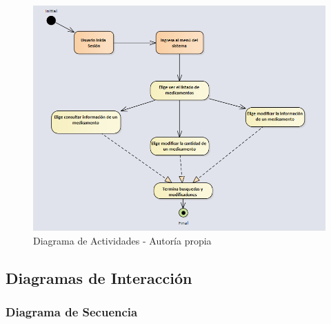 \begin{center}
    \begin{figure}[htb]
        \centering
        \includegraphics[width = 1.0\textwidth] {libro/capitulo5/img/Actividades.PNG}
        \caption{Diagrama de Actividades - Autor\'ia propia}
        \label{fig:my_label}
    \end{figure}
\end{center}
\newpage

\subsection{ Diagramas de Interacción}
\subsubsection{ Diagrama de Secuencia}

